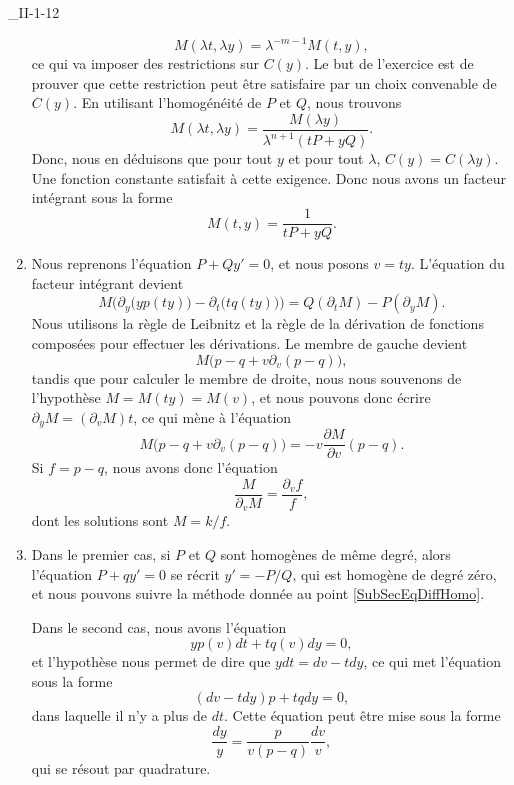 \begin{corrige}{_II-1-12}
\begin{enumerate}
\begin{equation}
	M(\lambda t,\lambda y)=\lambda^{-m-1}M(t,y),
\end{equation}
ce qui va imposer des restrictions sur $C(y)$. Le but de l'exercice est de prouver que cette restriction peut être satisfaire par un choix convenable de $C(y)$. En utilisant l'homogénéité de $P$ et $Q$, nous trouvons
\begin{equation}
	M(\lambda t,\lambda y)=\frac{ M(\lambda y) }{ \lambda^{n+1}(tP+yQ) }.
\end{equation}
Donc, nous en déduisons que pour tout $y$ et pour tout $\lambda$, $C(y)=C(\lambda y)$. Une fonction constante satisfait à cette exigence. Donc nous avons un facteur intégrant sous la forme
\begin{equation}
	M(t,y)=\frac{1}{ tP+yQ }.
\end{equation}

\item
Nous reprenons l'équation $P+Qy'=0$, et nous posons $v=ty$. L'équation du facteur intégrant devient
\begin{equation}
	M\Big( \partial_y \big( yp(ty) \big)-\partial_t \big( tq(ty) \big)  \Big)=Q(\partial_t M)-P(\partial_y M).
\end{equation}
Nous utilisons la règle de Leibnitz et la règle de la dérivation de fonctions composées pour effectuer les dérivations. Le membre de gauche devient
\begin{equation}
	M\big(p-q+v\partial_v(p-q)\big),
\end{equation}
tandis que pour calculer le membre de droite, nous nous souvenons de l'hypothèse $M=M(ty)=M(v)$, et nous pouvons donc écrire $\partial_y M=(\partial_vM)t$, ce qui mène à l'équation
\begin{equation}
	M\big(p-q+v\partial_v(p-q)\big)=-v\frac{ \partial M }{ \partial v }(p-q).
\end{equation}
Si $f=p-q$, nous avons donc l'équation
\begin{equation}
	\frac{ M }{ \partial_vM }=\frac{ \partial_vf }{ f },
\end{equation}
dont les solutions sont $M=k/f$.


\item Dans le premier cas, si $P$ et $Q$ sont homogènes de même degré, alors l'équation $P+qy'=0$ se récrit $y'=-P/Q$, qui est homogène de degré zéro, et nous pouvons suivre la méthode donnée au point \ref{SubSecEqDiffHomo}.

Dans le second cas, nous avons l'équation
\begin{equation}
	yp(v)dt+tq(v)dy=0,
\end{equation}
et l'hypothèse nous permet de dire que $ydt=dv-tdy$, ce qui met l'équation sous la forme
\begin{equation}
	(dv-tdy)p+tqdy=0,
\end{equation}
dans laquelle il n'y a plus de $dt$. Cette équation peut être mise sous la forme
\begin{equation}
	\frac{ dy }{ y }=\frac{ p }{ v(p-q) }\frac{ dv }{ v },
\end{equation}
qui se résout par quadrature.


\end{enumerate}
\end{corrige}
